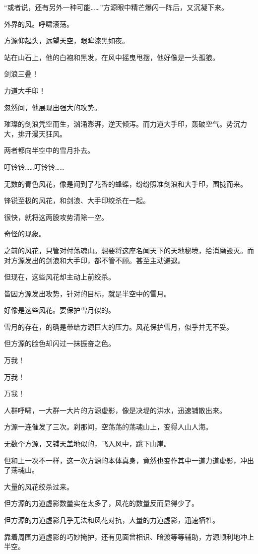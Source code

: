 \begin{this_body}
“或者说，还有另外一种可能……”方源眼中精芒爆闪一阵后，又沉凝下来。

外界的风。呼啸滚荡。

方源仰起头，远望天空，眼眸漆黑如夜。

站在山石上，他的白袍和黑发，在风中摇曳甩摆，他好像是一头孤狼。

剑浪三叠！

力道大手印！

忽然间，他展现出强大的攻势。

璀璨的剑浪凭空而生，汹涌澎湃，逆天倾泻。而力道大手印，轰破空气。势沉力大，排开漫天狂风。

两者都向半空中的雪月扑去。

叮铃铃……叮铃铃……

无数的青色风花，像是闻到了花香的蜂蝶，纷纷照准剑浪和大手印，围拢而来。

锋锐至极的风花，和剑浪、大手印绞杀在一起。

很快，就将这两股攻势清除一空。

奇怪的现象。

之前的风花，只管对付荡魂山。想要将这座名闻天下的天地秘境，给消磨毁灭。而对方源发出的剑浪和大手印，都不管不顾。甚至主动避退。

但现在，这些风花却主动上前绞杀。

皆因方源发出攻势，针对的目标，就是半空中的雪月。

好像是这些风花。要保护雪月似的。

雪月的存在，的确是带给方源巨大的压力。风花保护雪月，似乎并无不妥。

但方源的脸色却闪过一抹振奋之色。

万我！

万我！

万我！

人群呼啸，一大群一大片的方源虚影，像是决堤的洪水，迅速铺散出来。

方源一连催发了三次。刹那间，空荡荡的荡魂山上，变得人山人海。

无数个方源，又铺天盖地似的，飞入风中，跳下山崖。

但和上一次不一样，这一次方源的本体真身，竟然也变作其中一道力道虚影，冲出了荡魂山。

大量的风花绞杀过来。

但方源的力道虚影数量实在太多了，风花的数量反而显得少了。

但方源的力道虚影几乎无法和风花对抗，大量的力道虚影，迅速牺牲。

靠着周围力道虚影的巧妙掩护，还有见面曾相识、暗渡等等辅助，方源顺利地冲上半空。


\end{this_body}
